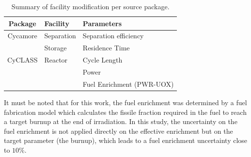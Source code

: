 \documentclass{anstrans}
\begin{document}
\begin{table}[htb]
\centering
  \caption{Summary of facility modification per source package.}
\begin{tabular}{cll}
\toprule

Package   & Facility   & Parameters                \\
\midrule
Cycamore & Separation & Separation efficiency     \\
         & Storage    & Residence Time            \\
\midrule
CyCLASS  & Reactor    & Cycle Length              \\
         &            & Power                     \\
         &            & Fuel Enrichment (PWR-UOX) \\

\bottomrule
\end{tabular}

  \label{tab:package_uncertainty}
\end{table}

It must be noted that for this work, the fuel enrichment was determined by a
fuel fabrication model\cite{Leniau2015125} which
calculates the fissile fraction required in the fuel to reach a target
burnup at the end of irradiation.  In this study, the uncertainty on the fuel
enrichment is not applied directly on the effective enrichment but on the target
parameter (the burnup), which leads to a fuel enrichment uncertainty close to
$10\%$.
\end{document}
